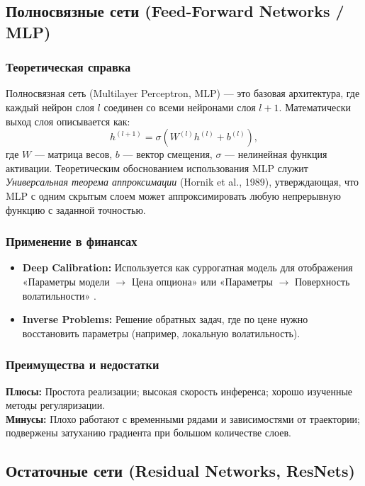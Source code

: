 \subsection{Полносвязные сети (Feed-Forward Networks / MLP)}

\subsubsection{Теоретическая справка}
Полносвязная сеть (Multilayer Perceptron, MLP) — это базовая архитектура, где каждый нейрон слоя $l$ соединен со всеми нейронами слоя $l+1$. Математически выход слоя описывается как:
\begin{equation}
    h^{(l+1)} = \sigma \left( W^{(l)} h^{(l)} + b^{(l)} \right),
\end{equation}
где $W$ — матрица весов, $b$ — вектор смещения, $\sigma$ — нелинейная функция активации.
Теоретическим обоснованием использования MLP служит \textit{Универсальная теорема аппроксимации} (Hornik et al., 1989), утверждающая, что MLP с одним скрытым слоем может аппроксимировать любую непрерывную функцию с заданной точностью.

\subsubsection{Применение в финансах}
\begin{itemize}
    \item \textbf{Deep Calibration:} Используется как суррогатная модель для отображения «Параметры модели $\to$ Цена опциона» или «Параметры $\to$ Поверхность волатильности» \cite{Horvath2019}.
    \item \textbf{Inverse Problems:} Решение обратных задач, где по цене нужно восстановить параметры (например, локальную волатильность).
\end{itemize}

\subsubsection{Преимущества и недостатки}
\textbf{Плюсы:} Простота реализации; высокая скорость инференса; хорошо изученные методы регуляризации. \\
\textbf{Минусы:} Плохо работают с временными рядами и зависимостями от траектории; подвержены затуханию градиента при большом количестве слоев.

\subsection{Остаточные сети (Residual Networks, ResNets)}

